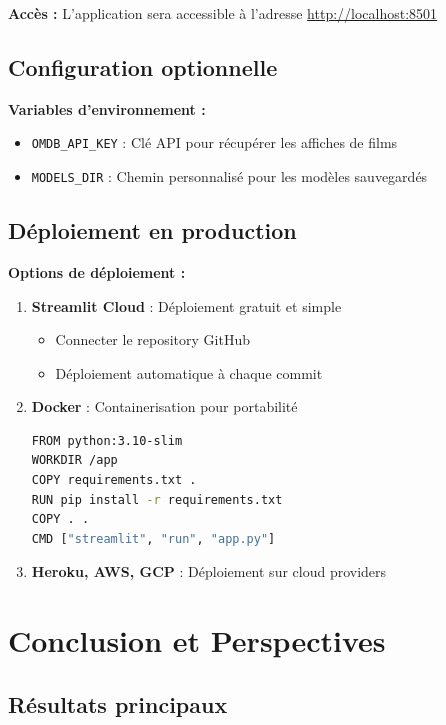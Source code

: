 \documentclass[12pt,a4paper]{article}
\begin{document}
\textbf{Accès :} L'application sera accessible à l'adresse \url{http://localhost:8501}

\subsection{Configuration optionnelle}

\textbf{Variables d'environnement :}
\begin{itemize}
    \item \texttt{OMDB\_API\_KEY} : Clé API pour récupérer les affiches de films
    \item \texttt{MODELS\_DIR} : Chemin personnalisé pour les modèles sauvegardés
\end{itemize}

\subsection{Déploiement en production}

\textbf{Options de déploiement :}

\begin{enumerate}
    \item \textbf{Streamlit Cloud} : Déploiement gratuit et simple
    \begin{itemize}
        \item Connecter le repository GitHub
        \item Déploiement automatique à chaque commit
    \end{itemize}
    
    \item \textbf{Docker} : Containerisation pour portabilité
    \begin{lstlisting}[language=bash, caption=Dockerfile exemple]
FROM python:3.10-slim
WORKDIR /app
COPY requirements.txt .
RUN pip install -r requirements.txt
COPY . .
CMD ["streamlit", "run", "app.py"]
    \end{lstlisting}
    
    \item \textbf{Heroku, AWS, GCP} : Déploiement sur cloud providers
\end{enumerate}

\section{Conclusion et Perspectives}

\subsection{Résultats principaux}
\end{document}
